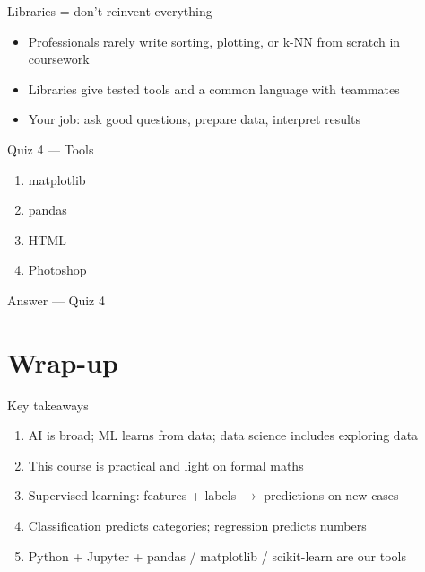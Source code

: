 \documentclass[aspectratio=169,11pt]{beamer}
\begin{document}
    \begin{frame}{Libraries = don't reinvent everything}
        \begin{itemize}
            \item Professionals rarely write sorting, plotting, or k-NN from scratch in coursework
            \item Libraries give tested tools and a common language with teammates
            \item Your job: ask good questions, prepare data, interpret results
        \end{itemize}
        \vspace{0.4em}
    \end{frame}

    \begin{frame}{Quiz 4 --- Tools}
        \begin{enumerate}
            \item matplotlib
            \item pandas
            \item HTML
            \item Photoshop
        \end{enumerate}
        \quizpause
    \end{frame}

    \begin{frame}{Answer --- Quiz 4}
    \end{frame}

    \section{Wrap-up}

    \begin{frame}{Key takeaways}
        \begin{enumerate}
            \item AI is broad; ML learns from data; data science includes exploring data
            \item This course is practical and light on formal maths
            \item Supervised learning: features + labels $\rightarrow$ predictions on new cases
            \item Classification predicts categories; regression predicts numbers
            \item Python + Jupyter + pandas / matplotlib / scikit-learn are our tools
        \end{enumerate}
    \end{frame}
\end{document}
